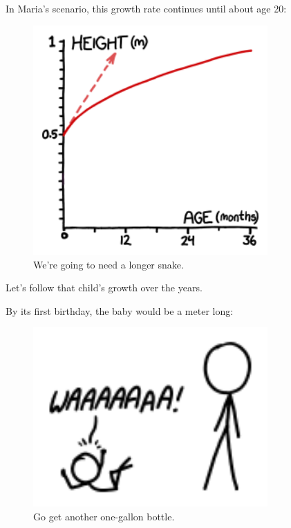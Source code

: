 {{In Maria's scenario, this growth rate continues until about age 20:}

\begin{figure}[!htbp]
\centering
\includegraphics[scale=0.5, max width=0.8\textwidth]{imgs/a/77/height_extrap.png}
\caption{We're going to need a longer snake.}
\end{figure}

{Let's follow that child's growth over the years.}

{By its first birthday, the baby would be a meter long:}

\begin{figure}[!htbp]
\centering
\includegraphics[scale=0.5, max width=0.8\textwidth]{imgs/a/77/height_1.png}
\caption{Go get another one-gallon bottle.}
\end{figure}

}
